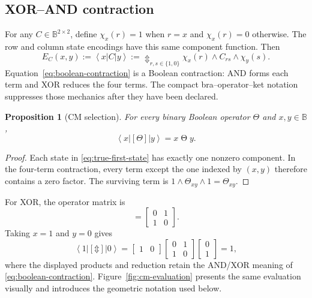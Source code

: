 \documentclass[11pt]{article}
\newcommand{\Bool}{\mathbb{B}}
\newcommand{\XOR}{\mathbin{\Updownarrow}}
\newcommand{\CM}[1]{[#1]}
\newcommand{\stateket}[1]{\left|#1\right\rangle}
\newcommand{\statebra}[1]{\left\langle#1\right|}
\newtheorem{proposition}{Proposition}
\begin{document}
\subsection{XOR--AND contraction}

For any $C\in\Bool^{2\times2}$, define
\(\chi_x(r)=1\) when \(r=x\) and \(\chi_x(r)=0\) otherwise. The row and
column state encodings have this same component function. Then
\begin{equation}
  E_C(x,y)
  :=\statebra{x}C\stateket{y}
  :=\mathop{\XOR}_{r,s\in\{1,0\}}
       \chi_x(r)\wedge C_{rs}\wedge\chi_y(s).
  \label{eq:boolean-contraction}
\end{equation}
Equation~\eqref{eq:boolean-contraction} is a Boolean contraction: AND forms
each term and XOR reduces the four terms. The compact bra--operator--ket
notation suppresses those mechanics after they have been declared.

\begin{proposition}[CM selection]
For every binary Boolean operator $\Theta$ and $x,y\in\Bool$,
\begin{equation}
  \statebra{x}\CM{\Theta}\stateket{y}
  =x\mathbin{\Theta}y.
  \label{eq:selection}
\end{equation}
\end{proposition}

\begin{proof}
Each state in \eqref{eq:true-first-state} has exactly one nonzero component.
In the four-term contraction, every term except the one indexed by $(x,y)$
therefore contains a zero factor. The surviving term is
$1\wedge\Theta_{xy}\wedge1=\Theta_{xy}$.
\end{proof}

For XOR, the operator matrix is
\begin{equation}
  \CM{\XOR}=\begin{bmatrix}0&1\\1&0\end{bmatrix}.
\end{equation}
Taking $x=1$ and $y=0$ gives
\begin{equation}
  \statebra{1}\CM{\XOR}\stateket{0}
  =\begin{bmatrix}1&0\end{bmatrix}
   \begin{bmatrix}0&1\\1&0\end{bmatrix}
   \begin{bmatrix}0\\1\end{bmatrix}
  =1,
\end{equation}
where the displayed products and reduction retain the AND/XOR meaning of
\eqref{eq:boolean-contraction}. Figure~\ref{fig:cm-evaluation} presents the
same evaluation visually and introduces the geometric notation used below.
\end{document}
